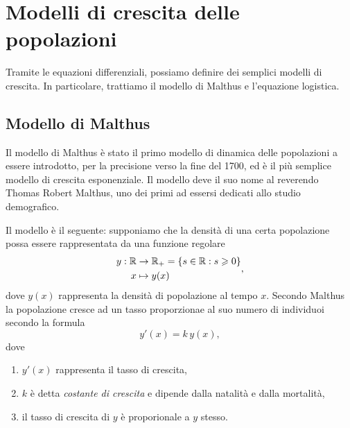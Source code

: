 \documentclass[../../analisi2]{subfiles}
\begin{document}
    \chapter{Modelli di crescita delle popolazioni}

        Tramite le equazioni differenziali, possiamo definire dei semplici modelli di crescita. In particolare, trattiamo il modello
        di Malthus e l'equazione logistica.

        \section{Modello di Malthus}

            Il modello di Malthus è stato il primo modello di dinamica delle popolazioni a essere introdotto, per la precisione verso la
            fine del 1700, ed è il più semplice modello di crescita esponenziale. Il modello deve il suo nome al reverendo Thomas Robert
            Malthus, uno dei primi ad essersi dedicati allo studio demografico.

            Il modello è il seguente: supponiamo che la densità di una certa popolazione possa essere rappresentata da una funzione
            regolare
            \[
                \begin{aligned}
                    y : \mathbb{R} &\to \mathbb{R}_+ = \left\{ s \in \mathbb{R} : s \geqslant 0\right\}\\
                    x &\mapsto y(x)
                \end{aligned}
                ,
            \]
            dove \(y(x)\) rappresenta la densità di popolazione al tempo \(x\). Secondo Malthus la popolazione cresce ad un tasso
            proporzionae al suo numero di individuoi secondo la formula
            \[
                y'(x) = k \, y(x),
            \]
            dove
            \begin{enumerate}
                \item \(y'(x)\) rappresenta il tasso di crescita,
                \item \(k\) è detta \emph{costante di crescita} e dipende dalla natalità e dalla mortalità,
                \item il tasso di crescita di \(y\) è proporionale a \(y\) stesso.
            \end{enumerate}
\end{document}
